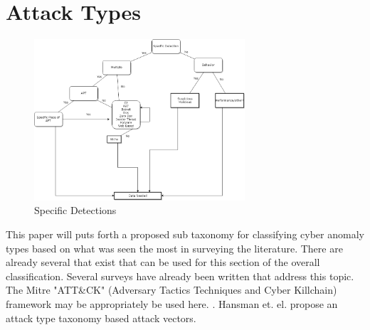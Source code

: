 \documentclass[conference]{IEEEtran}
\begin{document}
\section{Attack Types}
\begin{figure}[h]
  \includegraphics[width=.45\textwidth,height=6cm]{attack_types.png}
  \caption{Specific Detections}
  \label{AAA}
\end{figure}
This paper will puts forth a proposed sub taxonomy for classifying cyber anomaly types based on what was seen the most in surveying the literature. There are already several that exist that can be used for this section of the overall classification. Several surveys have already been written that address this topic. The Mitre "ATT\&CK" (Adversary Tactics Techniques and Cyber Killchain) framework may be appropriately be used here.  \cite{lazarevic2005intrusion}\cite{mitchell2014survey}\cite{axelsson2000intrusion}. Hansman et. el. propose an attack type taxonomy based attack vectors.
\cite{hansman2005taxonomy} \cite{hansman2005taxonomy} 
\end{document}
